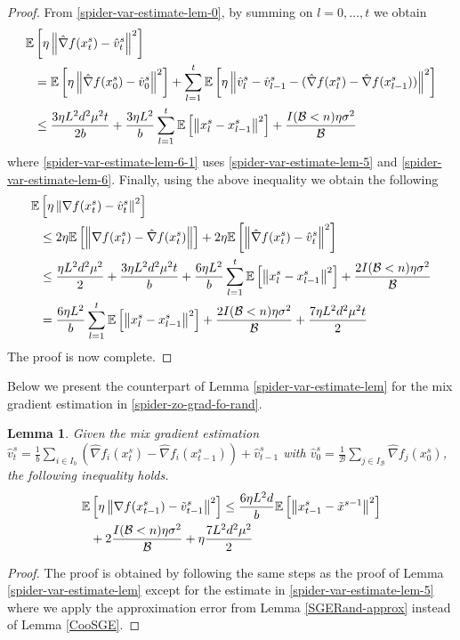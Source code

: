 \documentclass[iicol,sn-basic]{sn-jnl}
\theoremstyle{thmstyleone}%
\theoremstyle{thmstyletwo}%
\theoremstyle{thmstylethree}%
\newcommand*{\E}{\mathbb{E}}
\newcommand{\norm}[1]{\left\lVert#1\right\rVert}
\newtheorem{lemma}[theorem]{Lemma}
\begin{document}
\begin{proof}
From \eqref{spider-var-estimate-lem-0},  by summing on $l = 0, \ldots, t$ we obtain
\begin{align}
  \E&\left[\eta\norm{\hat{\nabla} f(x_{t}^s)-{\hat{v}_{t}^s}}^2\right]\notag\\
  & = \notag\E\left[\eta\norm{\hat{\nabla} f(x_{0}^s)-{\hat{v}_{0}^s}}^2\right] + \sum_{l = 1 }^{t}\E\left[\eta\norm{\hat{v}_{l}^s-{\hat{v}_{l-1}^s} - (\hat{\nabla} f(x_{l}^s) - \hat{\nabla} f(x_{l-1}^s))}^2\right]\\
  & \leq \frac{3 \eta L^2 d^2 \mu^2 t}{2b} + \frac{3\eta L^2}{b} \sum_{l = 1}^{t} \E\left[\norm{x_{l}^s-{x}_{l-1}^s}^2\right] + \frac{I(\mathcal{B} < n)\eta \sigma ^2}{\mathcal{B}} \,\,\label{spider-var-estimate-lem-6-1} 
\end{align}
where \eqref{spider-var-estimate-lem-6-1} uses \eqref{spider-var-estimate-lem-5} and \eqref{spider-var-estimate-lem-6}. Finally, using the above inequality we obtain the following  
\begin{align}
  \E&\left[\eta\norm{{\nabla} f(x_{t}^s)-{\hat{v}_{t}^s}}^2\right]\notag\\
  & \leq 2\eta\E\left[\norm{\nabla f(x_{t}^s)-\hat{\nabla} f(x_{t}^s)}\right] + 2\eta\E\left[\norm{\hat{\nabla} f(x_{t}^s)-{\hat{v}_{t}^s}}^2\right]\notag\\
  & \leq \frac{\eta L^2 d^2 \mu^2}{2} + \frac{3 \eta L^2 d^2 \mu^2 t}{b} + \frac{6\eta L^2}{b} \sum_{l = 1}^{t} \E\left[\norm{x_{l}^s-{x}_{l-1}^s}^2\right] + \frac{2 I(\mathcal{B} < n)\eta \sigma ^2}{\mathcal{B}} \\
  & = \frac{6\eta L^2}{b} \sum_{l = 1}^{t} \E\left[\norm{x_{l}^s-{x}_{l-1}^s}^2\right] + \frac{2 I(\mathcal{B} < n)\eta \sigma ^2}{\mathcal{B}} + \frac{7\eta L^2 d^2 \mu^2 t}{2}
\end{align}
 The proof is now complete.
\end{proof}

Below we present the counterpart of Lemma \ref{spider-var-estimate-lem} for the mix gradient estimation in \eqref{spider-zo-grad-fo-rand}.
\begin{lemma}\label{spider-RandSGE-var-estimate-lem}
Given the mix gradient estimation $\hat{v}_{t}^s = \frac{1}{b} \sum_{i\in I_b}\left(\hat{\nabla} f_{i}(x_{t}^s)-\hat{\nabla} f_{i}({x}_{t-1}^s)\right)+\hat{v}_{t-1}^s$ with $\hat{v}_{0}^s = \frac{1}{\mathcal{B}} \sum_{j\in I_{\mathcal{B}}} \hat{\nabla} f_j (x_0^{s})$, the following inequality holds. 
\begin{align}
\E&\left[\eta\norm{\nabla f(x_{t-1}^s)-{\tilde{v}_{t-1}^s}}^2\right] \leq  \frac{6\eta L^2 d}{b}\E\left[\norm{x_{t-1}^s-\tilde{x}^{s-1}}^2\right]\notag\\
&+ 2\frac{I(\mathcal{B} < n)\eta \sigma ^2}{\mathcal{B}}+\eta \frac{7L^2 d^2 \mu^2}{2}
\end{align}
\end{lemma}
\begin{proof}
The proof is obtained by following the same steps as the proof of Lemma \ref{spider-var-estimate-lem} except for the estimate in \eqref{spider-var-estimate-lem-5} where we apply the approximation error from Lemma \ref{SGERand-approx} instead of Lemma \ref{CooSGE}. 
\end{proof}
\end{document}
